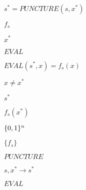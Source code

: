 \documentclass[10pt]{book}
\begin{document}
\begin{mdSnippets}
\begin{mdInlineSnippet}[a40b3cb602ebddffc8d23ca3a3063ab8]%
$s^*=PUNCTURE(s,x^*)$\end{mdInlineSnippet}%
\begin{mdInlineSnippet}[983340c663380eacde4a09812e2e3c2c]%
$f_s$\end{mdInlineSnippet}%
\begin{mdInlineSnippet}[5d9075efa0ec4b2e8228505844f11742]%
$x^*$\end{mdInlineSnippet}%
\begin{mdInlineSnippet}[1f8cb46fe06733d6f0dd650117e6ab66]%
$EVAL$\end{mdInlineSnippet}%
\begin{mdInlineSnippet}[ab7288dc2e25b8b5d849cb721f0eaecc]%
$EVAL(s^*,x)=f_s(x)$\end{mdInlineSnippet}%
\begin{mdInlineSnippet}[c9233e03983076893b8ac6591e0638d1]%
$x \neq x^*$\end{mdInlineSnippet}%
\begin{mdInlineSnippet}[a4f30b4084dd8599723853c370c75cc9]%
$s^*$\end{mdInlineSnippet}%
\begin{mdInlineSnippet}[d05500aa6c9c5acde0f7847030f992fd]%
$f_s(x^*)$\end{mdInlineSnippet}%
\begin{mdInlineSnippet}[5867c9b098884eca2779f6d98d4b0b29]%
$\{0,1\}^n$\end{mdInlineSnippet}%
\begin{mdInlineSnippet}[f0a0745b39ca7c74b201f7784e766521]%
$\{f_s\}$\end{mdInlineSnippet}%
\begin{mdInlineSnippet}[0ae38247a0db2f3b37545a2237f9ddb7]%
$PUNCTURE$\end{mdInlineSnippet}%
\begin{mdInlineSnippet}[275d11149034789a1f932a49258a45b6]%
$s,x^* \to s^*$\end{mdInlineSnippet}%
\begin{mdInlineSnippet}[1f8cb46fe06733d6f0dd650117e6ab66]%
$EVAL$\end{mdInlineSnippet}%

\end{mdSnippets}
\end{document}
